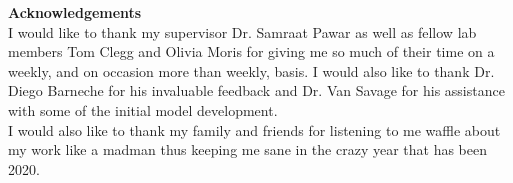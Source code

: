 
\mbox{}\newline\vspace{10mm} \mbox{}\LARGE
%
{\bf Acknowledgements} \normalsize \vspace{-8mm}\\
I would like to thank my supervisor Dr. Samraat Pawar as well as fellow lab members Tom Clegg and Olivia Moris for giving me so much of their time on a weekly, and on occasion more than weekly, basis.  I would also like to thank Dr. Diego Barneche for his invaluable feedback and Dr. Van Savage for his assistance with some of the initial model development.
\\
I would also like to thank my family and friends for listening to me waffle about my work like a madman thus keeping me sane in the crazy year that has been 2020.





